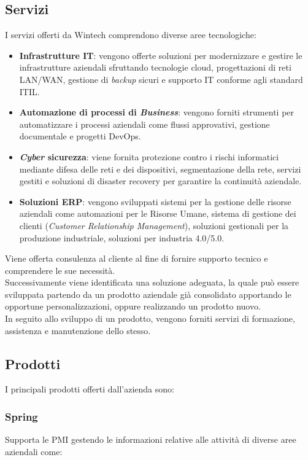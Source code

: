 \subsection{Servizi}
I servizi offerti da Wintech comprendono diverse aree tecnologiche:
\begin{itemize}
	\item \textbf{Infrastrutture \gls{IT}}: vengono offerte soluzioni per modernizzare e gestire le infrastrutture aziendali sfruttando tecnologie \gls{cloud}, progettazioni di reti \gls{LAN}/\gls{WAN}, gestione di \emph{backup} sicuri e supporto \gls{IT} conforme agli standard \gls{ITIL}. 
	\item \textbf{Automazione di processi di \emph{Business}}: vengono forniti strumenti per automatizzare i processi aziendali come flussi approvativi, gestione documentale e progetti \gls{DevOps}.
	\item \textbf{\emph{Cyber} sicurezza}: viene fornita protezione contro i rischi informatici mediante difesa delle reti e dei dispositivi, segmentazione della rete, servizi gestiti e soluzioni di \gls{disaster recovery} per garantire la continuità aziendale. 
	\item \textbf{Soluzioni \gls{ERP}}: vengono sviluppati sistemi per la gestione delle risorse aziendali come automazioni per le Risorse Umane, sistema di gestione dei clienti (\emph{Customer Relationship Management}), soluzioni gestionali per la produzione industriale, soluzioni per industria 4.0/5.0.\\
\end{itemize}
Viene offerta consulenza al cliente al fine di fornire supporto tecnico e comprendere le sue necessità.\\
Successivamente viene identificata una soluzione adeguata, la quale può essere sviluppata partendo da un prodotto aziendale già consolidato apportando le opportune personalizzazioni, oppure realizzando un prodotto nuovo.\\
In seguito allo sviluppo di un prodotto, vengono forniti servizi di formazione, assistenza e manutenzione dello stesso. 

\subsection{Prodotti}
I principali prodotti offerti dall'azienda sono: 

\subsubsection*{Spring}
Supporta le \gls{PMI} gestendo le informazioni relative alle attività di diverse aree aziendali come: 

